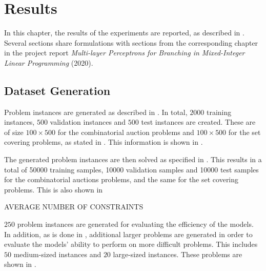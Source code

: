 \chapter{Results}\label{cha:results}

In this chapter, the results of the experiments are reported, as described in . Several sections share formulations with sections from the corresponding chapter in the project report \textit{Multi-layer Perceptrons for Branching in Mixed-Integer Linear Programming} (2020). 


\section{Dataset Generation}\label{sec:datagen}

Problem instances are generated as described in . In total, $2000$ training instances, $500$ validation instances and $ 500 $ test instances are created. These are of size $100 \times 500$ for the combinatorial auction problems and $100 \times 500$ for the set covering problems, as stated in . This information is shown in .

The generated problem instances are then solved as specified in . This results in a total of 50000 training samples, 10000 validation samples and 10000 test samples for the combinatorial auctions problems, and the same for the set covering problems. This is also shown in 

AVERAGE NUMBER OF CONSTRAINTS

$250$ problem instances are generated for evaluating the efficiency of the models. In addition, as is done in \cite{gasse2019exact}, additional larger problems are generated in order to evaluate the models' ability to perform on more difficult problems. This includes $50$ medium-sized instances and $20$ large-sized instances. These problems are shown in .

